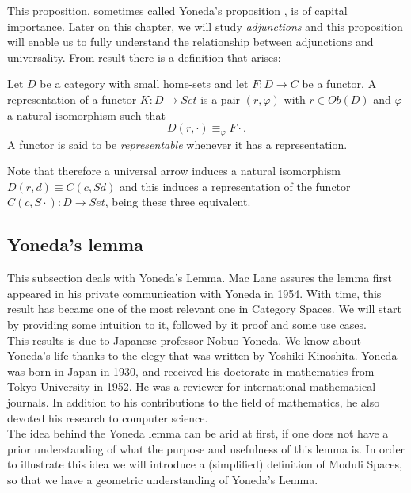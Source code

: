   This proposition, sometimes called Yoneda's proposition \cite[p. 81]{mac2013categories}, is of capital importance. Later on this chapter, we will study \emph{adjunctions} and this proposition will enable us to fully understand the relationship between adjunctions and universality. From result there is a definition that arises:

\begin{definition}
  Let $D$ be a category with small home-sets and let $F:D\to C$ be a functor. A representation of a functor $K:D\to Set$ is a pair $(r,\varphi)$ with $r \in Ob(D)$ and $ \varphi$ a natural isomorphism  such that
  $$D(r,\cdot) \equiv_{\varphi} F\cdot.$$
  A functor is said to be \emph{representable} whenever it has a representation.
\end{definition}

Note that therefore a universal arrow induces a natural isomorphism $D(r,d)\equiv C(c,Sd)$ and this induces a representation of the functor $C(c,S\cdot): D\to Set$, being these three equivalent.

\subsection{Yoneda's lemma}
This subsection  deals with Yoneda's Lemma. Mac Lane\cite{mac2013categories} assures the lemma first appeared in his private communication with Yoneda in 1954. With time, this result has became one of the most relevant one in Category Spaces. We will start by providing some intuition to it, followed by it proof and some use cases.\\


 This results is due to Japanese professor Nobuo Yoneda. We know about Yoneda's life thanks to the elegy that was written by Yoshiki Kinoshita\cite{YonedaLife}. Yoneda was born in Japan in 1930, and received his doctorate in mathematics from Tokyo University in 1952. He was a reviewer for international mathematical journals. In addition to his contributions to the field of mathematics, he also devoted his research to computer science.\\


The idea behind the Yoneda lemma can be arid at first, if one does not have a prior understanding of what the purpose and usefulness of this lemma is. In order to illustrate this idea we will introduce a (simplified) definition of Moduli Spaces, so that we have a geometric understanding of Yoneda's Lemma.\\

